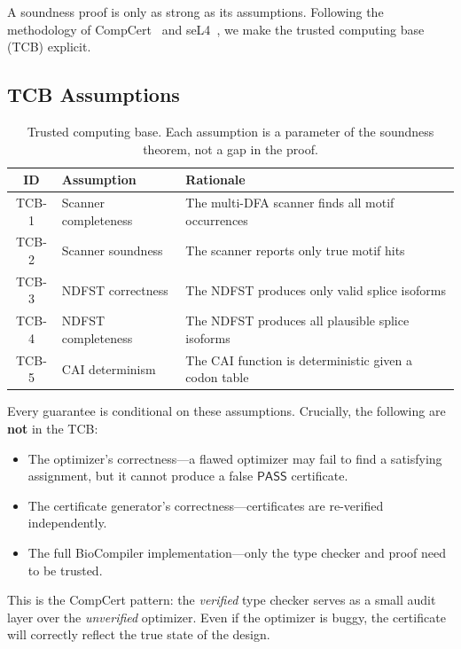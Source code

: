\documentclass[runningheads]{llncs}
\newcommand{\PASS}{\ensuremath{\mathsf{PASS}}\xspace}
\begin{document}
A soundness proof is only as strong as its assumptions.
Following the methodology of CompCert~\cite{leroy2009compcert} and seL4~\cite{klein2014sel4}, we make the trusted computing base (TCB) explicit.

\subsection{TCB Assumptions}

\begin{table}[t]
\centering
\caption{Trusted computing base. Each assumption is a parameter of the soundness theorem, not a gap in the proof.}
\label{tab:tcb}
\begin{tabular}{clp{5.5cm}}
\toprule
\textbf{ID} & \textbf{Assumption} & \textbf{Rationale} \\
\midrule
TCB-1 & Scanner completeness & The multi-DFA scanner finds all motif occurrences \\
TCB-2 & Scanner soundness & The scanner reports only true motif hits \\
TCB-3 & NDFST correctness & The NDFST produces only valid splice isoforms \\
TCB-4 & NDFST completeness & The NDFST produces all plausible splice isoforms \\
TCB-5 & CAI determinism & The CAI function is deterministic given a codon table \\
\bottomrule
\end{tabular}
\end{table}

Every guarantee is conditional on these assumptions.
Crucially, the following are \textbf{not} in the TCB:
\begin{itemize}[leftmargin=*,itemsep=0pt,topsep=1pt]
\item The optimizer's correctness---a flawed optimizer may fail to find a satisfying assignment, but it cannot produce a false \PASS{} certificate.
\item The certificate generator's correctness---certificates are re-verified independently.
\item The full BioCompiler implementation---only the type checker and proof need to be trusted.
\end{itemize}

This is the CompCert pattern: the \emph{verified} type checker serves as a small audit layer over the \emph{unverified} optimizer.
Even if the optimizer is buggy, the certificate will correctly reflect the true state of the design.
\end{document}
